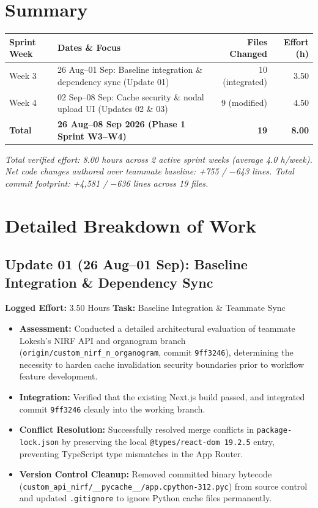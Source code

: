 \documentclass[11pt,a4paper]{article}
\begin{document}
\section*{Summary}

\begin{table}[h]
\centering
\renewcommand{\arraystretch}{1.2}
\begin{tabular}{llrr}
\toprule
\textbf{Sprint Week} & \textbf{Dates \& Focus} & \textbf{Files Changed} & \textbf{Effort (h)} \\
\midrule
Week 3 & 26 Aug--01 Sep: Baseline integration \& dependency sync (Update 01) & 10 (integrated) & 3.50 \\
Week 4 & 02 Sep--08 Sep: Cache security \& nodal upload UI (Updates 02 \& 03) & 9 (modified) & 4.50 \\
\midrule
\textbf{Total} & \textbf{26 Aug--08 Sep 2026 (Phase 1 Sprint W3--W4)} & \textbf{19} & \textbf{8.00} \\
\bottomrule
\end{tabular}
\end{table}

\textit{Total verified effort: 8.00 hours across 2 active sprint weeks (average 4.0 h/week). Net code changes authored over teammate baseline: +755 / $-$643 lines. Total commit footprint: +4,581 / $-$636 lines across 19 files.}

\section*{Detailed Breakdown of Work}

\subsection*{Update 01 (26 Aug--01 Sep): Baseline Integration \& Dependency Sync}
\textbf{Logged Effort:} 3.50 Hours \quad \textbf{Task:} Baseline Integration \& Teammate Sync
\begin{itemize}[leftmargin=1.4em, itemsep=2pt]
\item \textbf{Assessment:} Conducted a detailed architectural evaluation of teammate Lokesh's NIRF API and organogram branch (\texttt{origin/custom\_nirf\_n\_organogram}, commit \texttt{9ff3246}), determining the necessity to harden cache invalidation security boundaries prior to workflow feature development.
\item \textbf{Integration:} Verified that the existing Next.js build passed, and integrated commit \texttt{9ff3246} cleanly into the working branch.
\item \textbf{Conflict Resolution:} Successfully resolved merge conflicts in \texttt{package-lock.json} by preserving the local \texttt{@types/react-dom 19.2.5} entry, preventing TypeScript type mismatches in the App Router.
\item \textbf{Version Control Cleanup:} Removed committed binary bytecode (\texttt{custom\_api\_nirf/\_\_pycache\_\_/app.cpython-312.pyc}) from source control and updated \texttt{.gitignore} to ignore Python cache files permanently.
\end{itemize}
\end{document}
